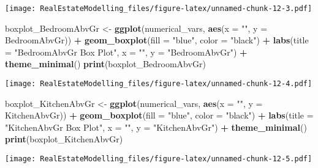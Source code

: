 \documentclass[
]{article}
\newenvironment{Shaded}{\begin{snugshade}}{\end{snugshade}}
\newcommand{\AttributeTok}[1]{\textcolor[rgb]{0.13,0.29,0.53}{#1}}
\newcommand{\FunctionTok}[1]{\textcolor[rgb]{0.13,0.29,0.53}{\textbf{#1}}}
\newcommand{\NormalTok}[1]{#1}
\newcommand{\OtherTok}[1]{\textcolor[rgb]{0.56,0.35,0.01}{#1}}
\newcommand{\SpecialCharTok}[1]{\textcolor[rgb]{0.81,0.36,0.00}{\textbf{#1}}}
\newcommand{\StringTok}[1]{\textcolor[rgb]{0.31,0.60,0.02}{#1}}
\begin{document}
\texttt{[image: RealEstateModelling\_files/figure-latex/unnamed-chunk-12-3.pdf]}

\begin{Shaded}
\begin{Highlighting}[]
\NormalTok{boxplot\_BedroomAbvGr }\OtherTok{\textless{}{-}} \FunctionTok{ggplot}\NormalTok{(numerical\_vars, }\FunctionTok{aes}\NormalTok{(}\AttributeTok{x =} \StringTok{""}\NormalTok{, }\AttributeTok{y =}\NormalTok{ BedroomAbvGr)) }\SpecialCharTok{+}
  \FunctionTok{geom\_boxplot}\NormalTok{(}\AttributeTok{fill =} \StringTok{"blue"}\NormalTok{, }\AttributeTok{color =} \StringTok{"black"}\NormalTok{) }\SpecialCharTok{+}
  \FunctionTok{labs}\NormalTok{(}\AttributeTok{title =} \StringTok{"BedroomAbvGr Box Plot"}\NormalTok{, }\AttributeTok{x =} \StringTok{""}\NormalTok{, }\AttributeTok{y =} \StringTok{"BedroomAbvGr"}\NormalTok{) }\SpecialCharTok{+}
  \FunctionTok{theme\_minimal}\NormalTok{()}
\FunctionTok{print}\NormalTok{(boxplot\_BedroomAbvGr)}
\end{Highlighting}
\end{Shaded}

\texttt{[image: RealEstateModelling\_files/figure-latex/unnamed-chunk-12-4.pdf]}

\begin{Shaded}
\begin{Highlighting}[]
\NormalTok{boxplot\_KitchenAbvGr }\OtherTok{\textless{}{-}} \FunctionTok{ggplot}\NormalTok{(numerical\_vars, }\FunctionTok{aes}\NormalTok{(}\AttributeTok{x =} \StringTok{""}\NormalTok{, }\AttributeTok{y =}\NormalTok{ KitchenAbvGr)) }\SpecialCharTok{+}
  \FunctionTok{geom\_boxplot}\NormalTok{(}\AttributeTok{fill =} \StringTok{"blue"}\NormalTok{, }\AttributeTok{color =} \StringTok{"black"}\NormalTok{) }\SpecialCharTok{+}
  \FunctionTok{labs}\NormalTok{(}\AttributeTok{title =} \StringTok{"KitchenAbvGr Box Plot"}\NormalTok{, }\AttributeTok{x =} \StringTok{""}\NormalTok{, }\AttributeTok{y =} \StringTok{"KitchenAbvGr"}\NormalTok{) }\SpecialCharTok{+}
  \FunctionTok{theme\_minimal}\NormalTok{()}
\FunctionTok{print}\NormalTok{(boxplot\_KitchenAbvGr)}
\end{Highlighting}
\end{Shaded}

\texttt{[image: RealEstateModelling\_files/figure-latex/unnamed-chunk-12-5.pdf]}
\end{document}
